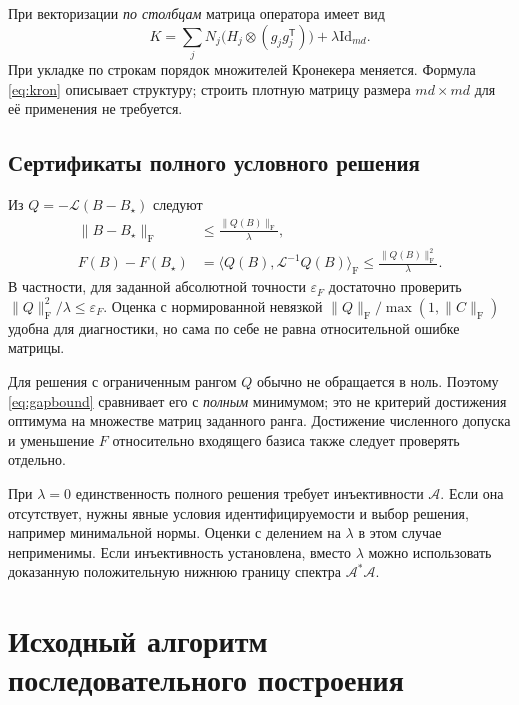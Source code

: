 \documentclass[11pt,a4paper]{article}
\numberwithin{equation}{section}
\theoremstyle{remark}
\newcommand{\Id}{\mathrm{Id}}
\newcommand{\T}{^{\mathsf T}}
\newcommand{\F}{_{\mathrm F}}
\newcommand{\ip}[2]{\langle #1,#2\rangle_{\mathrm F}}
\begin{document}
При векторизации \emph{по столбцам} матрица оператора имеет вид
\begin{equation}\label{eq:kron}
 K=\sum_jN_j\bigl(H_j\otimes(g_jg_j\T)\bigr)+\lambda\Id_{md}.
\end{equation}
При укладке по строкам порядок множителей Кронекера меняется.
Формула \eqref{eq:kron} описывает структуру; строить плотную матрицу
размера $md\times md$ для её применения не требуется.

\subsection{Сертификаты полного условного решения}\label{sec:certificate}
Из $Q=-\mathcal L(B-B_\star)$ следуют
\begin{align}
 \|B-B_\star\|\F&\le\frac{\|Q(B)\|\F}{\lambda},\label{eq:solutionbound}\\
 F(B)-F(B_\star)
 &=\ip{Q(B)}{\mathcal L^{-1}Q(B)}
 \le\frac{\|Q(B)\|\F^2}{\lambda}.\label{eq:gapbound}
\end{align}
В частности, для заданной абсолютной точности $\varepsilon_F$ достаточно
проверить $\|Q\|\F^2/\lambda\le\varepsilon_F$.
Оценка с нормированной невязкой $\|Q\|\F/\max(1,\|C\|\F)$ удобна для
диагностики, но сама по себе не равна относительной ошибке матрицы.

Для решения с ограниченным рангом $Q$ обычно не обращается в ноль.
Поэтому \eqref{eq:gapbound} сравнивает его с \emph{полным} минимумом;
это не критерий достижения оптимума на множестве матриц заданного ранга.
Достижение численного допуска и уменьшение $F$ относительно входящего
базиса также следует проверять отдельно.

При $\lambda=0$ единственность полного решения требует инъективности
$\mathcal A$. Если она отсутствует, нужны явные условия идентифицируемости
и выбор решения, например минимальной нормы. Оценки с делением на $\lambda$
в этом случае неприменимы. Если инъективность установлена, вместо $\lambda$
можно использовать доказанную положительную нижнюю границу спектра
$\mathcal A^*\mathcal A$.

\section{Исходный алгоритм последовательного построения}\label{sec:greedy}
\end{document}
